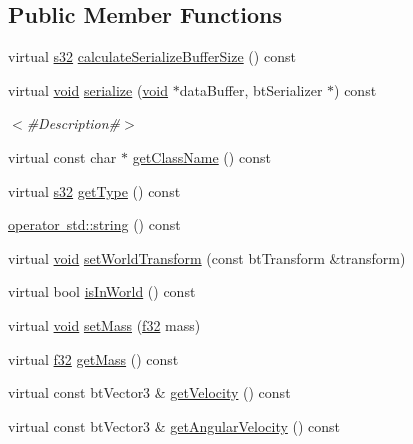 \subsection*{Public Member Functions}
\begin{DoxyCompactItemize}
\item 
virtual \mbox{\hyperlink{_util_8h_aa62c75d314a0d1f37f79c4b73b2292e2}{s32}} \mbox{\hyperlink{classnjli_1_1_physics_body_ghost_aba5336f0f355644716a17ccc03b83535}{calculate\+Serialize\+Buffer\+Size}} () const
\item 
virtual \mbox{\hyperlink{_thread_8h_af1e856da2e658414cb2456cb6f7ebc66}{void}} \mbox{\hyperlink{classnjli_1_1_physics_body_ghost_ad3f75b8cbff7431afbb14569bda203c4}{serialize}} (\mbox{\hyperlink{_thread_8h_af1e856da2e658414cb2456cb6f7ebc66}{void}} $\ast$data\+Buffer, bt\+Serializer $\ast$) const
\begin{DoxyCompactList}\small\item\em $<$\#\+Description\#$>$ \end{DoxyCompactList}\item 
virtual const char $\ast$ \mbox{\hyperlink{classnjli_1_1_physics_body_ghost_aa04661e7cd05271931351076c53991b2}{get\+Class\+Name}} () const
\item 
virtual \mbox{\hyperlink{_util_8h_aa62c75d314a0d1f37f79c4b73b2292e2}{s32}} \mbox{\hyperlink{classnjli_1_1_physics_body_ghost_a8b7a0599b7da88fbcf61451dc066748f}{get\+Type}} () const
\item 
\mbox{\hyperlink{classnjli_1_1_physics_body_ghost_a86a29fb8d31a0b8f5cee712b8f84d7b8}{operator std\+::string}} () const
\item 
virtual \mbox{\hyperlink{_thread_8h_af1e856da2e658414cb2456cb6f7ebc66}{void}} \mbox{\hyperlink{classnjli_1_1_physics_body_ghost_a489d0e67788ff5c74033824814470855}{set\+World\+Transform}} (const bt\+Transform \&transform)
\item 
virtual bool \mbox{\hyperlink{classnjli_1_1_physics_body_ghost_a6b131b8407733cc046c4c8fa38b35055}{is\+In\+World}} () const
\item 
virtual \mbox{\hyperlink{_thread_8h_af1e856da2e658414cb2456cb6f7ebc66}{void}} \mbox{\hyperlink{classnjli_1_1_physics_body_ghost_a1edc30655aa0495dbf60c59138cb52e2}{set\+Mass}} (\mbox{\hyperlink{_util_8h_a5f6906312a689f27d70e9d086649d3fd}{f32}} mass)
\item 
virtual \mbox{\hyperlink{_util_8h_a5f6906312a689f27d70e9d086649d3fd}{f32}} \mbox{\hyperlink{classnjli_1_1_physics_body_ghost_ade6ffdabf6c80a9443b2021848872edb}{get\+Mass}} () const
\item 
virtual const bt\+Vector3 \& \mbox{\hyperlink{classnjli_1_1_physics_body_ghost_aee53dbc6a3aba8ab33c10e3523f1f4dc}{get\+Velocity}} () const
\item 
virtual const bt\+Vector3 \& \mbox{\hyperlink{classnjli_1_1_physics_body_ghost_a01a4600e0521f09ec19879c1bdea3b8c}{get\+Angular\+Velocity}} () const
\end{DoxyCompactItemize}

